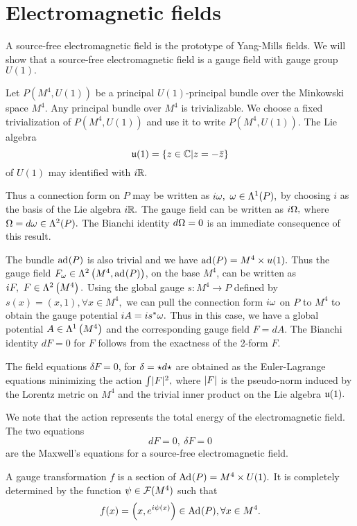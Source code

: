 \section{Electromagnetic fields}

A source-free electromagnetic field is the prototype of Yang-Mills fields. We will show that a source-free
electromagnetic field is a gauge field with gauge group $U(1).$

Let $P(M^{4}, U(1))$ be a principal $U(1)$-principal bundle over the Minkowski space $M^{4}.$ Any principal bundle over
$M^{4}$ is trivializable. We choose a fixed trivialization of $P(M^{4},U(1))$ and use it to write $P(M^{4}, U(1)).$ The
Lie algebra
$$
\mathfrak{u}(1)=\left\{ z \in \mathbb C | z = -\bar{z} \right\}
$$
of $U(1)$ may identified with $i\mathbb R.$

Thus a connection form on $P$ may be written as $i \omega,$ $\omega \in \Lambda^{1}(P),$ by choosing $i$ as the basis of the Lie
algebra $i\mathbb R.$ The gauge field can be written as $i  \Omega,$ where $\Omega = d\omega \in \Lambda^{2}(P).$ The Bianchi identity $d
\Omega = 0$ is an immediate consequence of this result. 

The bundle $\operatorname{ad}_{}(P)$ is also trivial and we have $\operatorname{ad}_{}(P)=M^{4}\times u(1).$ Thus the gauge field $F_{\omega} \in
\Lambda^{2}\left(M^{4}, \operatorname{ad}_{}(P)\right)$, on the base $M^{4}$, can be written as $iF, \ F \in \Lambda^{2}\left(M^{4}\right).$ Using the global gauge
$s:M^{4} \to P$ defined by $s(x)=(x,1), \forall x \in M^{4},$ we can pull the connection form $i \omega$ on $P$ to $M^{4}$
to obtain the gauge potential $iA=is^{*}\omega.$ Thus in this case, we have a global potential $A \in \Lambda^{1}\left(M^{4}\right)$ and
the corresponding gauge field $F=dA.$ The Bianchi identity $dF=0$ for $F$ follows  from the exactness of the 2-form $F.$

The field equations $\delta F=0$, for $\delta=\star d \star$ are obtained as the Euler-Lagrange equations minimizing the
action $\int \lvert F \rvert^{2},$ where $\lvert F \rvert$ is the pseudo-norm induced by the Lorentz metric on $M^{4}$ and the trivial
inner product on the Lie algebra $\mathfrak{u}(1).$

We note that the action represents the total energy of the electromagnetic field. The two equations 
\begin{equation}
 \label{MM:8.1}
dF=0, \ \delta F=0
\end{equation}
are the Maxwell's equations for a source-free electromagnetic field.

A gauge transformation $f$ is a section of $\operatorname{Ad}_{}(P)=M^{4}\times U(1).$ It is completely determined by the function
$\psi \in \mathcal{F}(M^{4})$ such that 
$$
f(x)=\left( x, e^{i\psi(x)} \right) \in \operatorname{Ad}_{}(P), \forall x \in M^{4}.
$$

